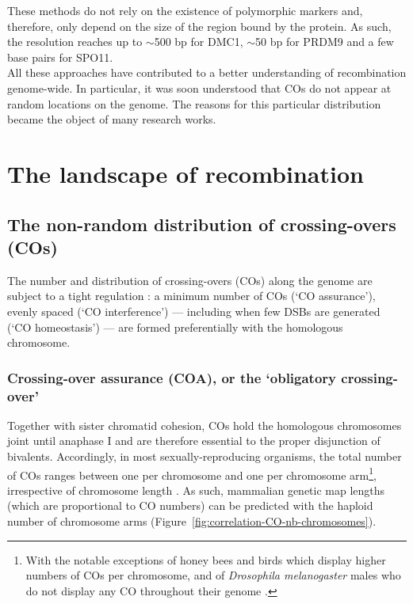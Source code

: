 These methods do not rely on the existence of polymorphic markers and, therefore, only depend on the size of the region bound by the protein.
As such, the resolution reaches up to $\sim$500 bp for DMC1, $\sim$50 bp for PRDM9 and a few base pairs for SPO11.\\

All these approaches have contributed to a better understanding of recombination genome-wide.
In particular, it was soon understood that COs do not appear at random locations on the genome.
The reasons for this particular distribution became the object of many research works.




\section{The landscape of recombination}

\subsection{The non-random distribution of crossing-overs (COs)}

The number and distribution of crossing-overs (COs) along the genome are subject to a tight regulation \citep[reviewed in][]{jones1984control, jones2006meiotic}: a minimum number of COs (‘CO assurance’), evenly spaced (‘CO interference’) — including when few DSBs are generated (‘CO homeostasis’) — are formed preferentially with the homologous chromosome.

\subsubsection{Crossing-over assurance (COA), or the ‘obligatory crossing-over’}
Together with sister chromatid cohesion, COs hold the homologous chromosomes joint until anaphase I \citep[reviewed in][]{roeder1997meiotic} and are therefore essential to the proper disjunction of bivalents.
Accordingly, in most sexually-reproducing organisms, the total number of COs ranges between one per chromosome and one per chromosome arm\footnote{With the notable exceptions of honey bees \citep{beye2006exceptionally} and birds \citep{groenen2009highdensity} which display higher numbers of COs per chromosome, and of \textit{Drosophila melanogaster} males who do not display any CO throughout their genome \citep{mckee1998pairing}.}, irrespective of chromosome length \citep{dutrillaux1986role,pardo-manueldevillena2001recombination,dumas2002chromosomal,hillers2003chromosomewide,hassold2004cytological,dumont2017variation}.
As such, mammalian genetic map lengths (which are proportional to CO numbers) can be predicted with the haploid number of chromosome arms (Figure~\ref{fig:correlation-CO-nb-chromosomes}).


